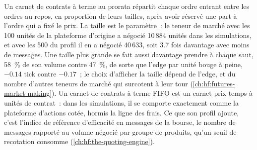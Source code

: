 Un carnet de contrats à terme au prorata répartit chaque ordre entrant entre les ordres au repos, en proportion de leurs tailles, après avoir réservé une part à l'ordre qui
a fixé le prix. La taille est le paramètre~: le teneur de marché avec les 100 unités de la plateforme d'origine a négocié 10\,884 unités dans les simulations, et avec les 500 du profil il en a négocié
40\,633, soit 3.7 fois davantage avec moins de messages. Une taille plus grande se fait aussi davantage prendre à chaque saut, 58~\% de son volume contre 47~\%, de sorte que
l'edge par unité bouge à peine, $-0.14$ tick contre $-0.17$~; le choix d'afficher la taille dépend de l'edge, et du nombre d'autres teneurs de marché
qui surcotent à leur tour (\cref{ch:hf:futures-market-making}). Un carnet de contrats à terme FIFO est un carnet prix-temps à unités de contrat~: dans les simulations, il
se comporte exactement comme la plateforme d'actions cotée, hormis la ligne des frais. Ce que son profil ajoute, c'est l'indice de référence d'efficacité en messages de la bourse, le nombre de messages rapporté au volume négocié
par groupe de produits, qu'un seuil de recotation consomme (\cref{ch:hf:the-quoting-engine}).

